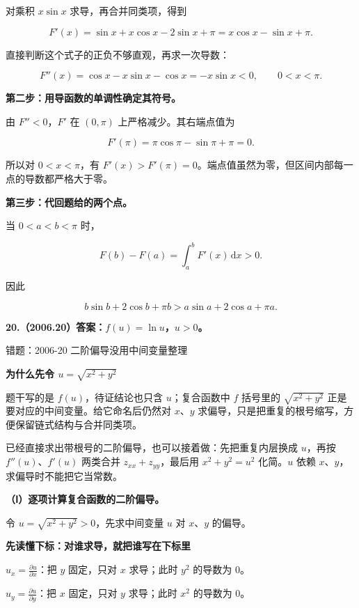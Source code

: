 \documentclass[UTF8,11pt,fontset=windows]{ctexart}
\begin{document}
对乘积 $x\sin x$ 求导，再合并同类项，得到

$$
F'(x)=\sin x+x\cos x-2\sin x+\pi
=x\cos x-\sin x+\pi.
$$

直接判断这个式子的正负不够直观，再求一次导数：

$$
F''(x)=\cos x-x\sin x-\cos x
=-x\sin x<0,\qquad0<x<\pi.
$$

\textbf{第二步：用导函数的单调性确定其符号。}

由 $F''<0$，$F'$ 在 $(0,\pi)$ 上严格减少。其右端点值为

$$
F'(\pi)=\pi\cos\pi-\sin\pi+\pi=0.
$$

所以对 $0<x<\pi$，有 $F'(x)>F'(\pi)=0$。端点值虽然为零，但区间内部每一点的导数都严格大于零。

\textbf{第三步：代回题给的两个点。}

当 $0<a<b<\pi$ 时，

$$
F(b)-F(a)=\int_a^bF'(x)\,\mathrm dx>0.
$$

因此

$$
\boxed{b\sin b+2\cos b+\pi b
>a\sin a+2\cos a+\pi a.}
$$

\clearpage

\textbf{20.（2006.20）答案：$f(u)=\ln u$，$u>0$。}

\begingroup\color{gray}错题：2006-20 二阶偏导没用中间变量整理\par\endgroup

{\bfseries 为什么先令 $u=\sqrt{x^2+y^2}$\par}
题干写的是 $f(u)$，待证结论也只含 $u$；复合函数中 $f$ 括号里的 $\sqrt{x^2+y^2}$ 正是要对应的中间变量。给它命名后仍然对 $x$、$y$ 求偏导，只是把重复的根号缩写，方便保留链式结构与合并同类项。

已经直接求出带根号的二阶偏导，也可以接着做：先把重复内层换成 $u$，再按 $f''(u)$、$f'(u)$ 两类合并 $z_{xx}+z_{yy}$，最后用 $x^2+y^2=u^2$ 化简。$u$ 依赖 $x$、$y$，求偏导时不能把它当常数。

\textbf{（Ⅰ）逐项计算复合函数的二阶偏导。}

令 $u=\sqrt{x^2+y^2}>0$，先求中间变量 $u$ 对 $x$、$y$ 的偏导。

{\bfseries 先读懂下标：对谁求导，就把谁写在下标里\par}
$u_x=\frac{\partial u}{\partial x}$：把 $y$ 固定，只对 $x$ 求导；此时 $y^2$ 的导数为 $0$。

$u_y=\frac{\partial u}{\partial y}$：把 $x$ 固定，只对 $y$ 求导；此时 $x^2$ 的导数为 $0$。
\end{document}
